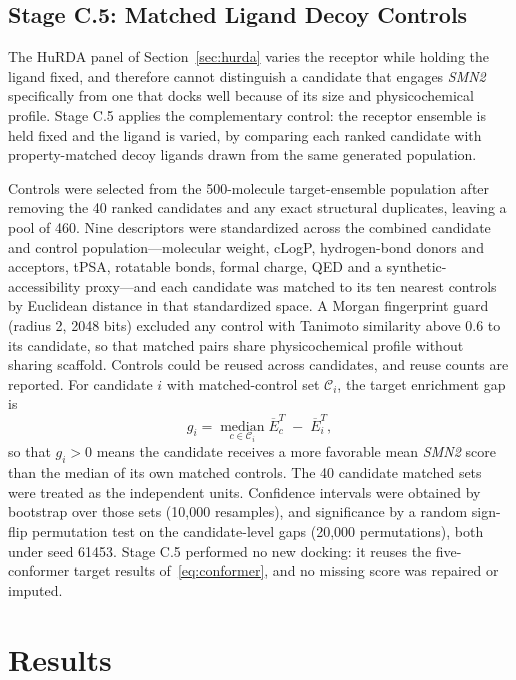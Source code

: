 \documentclass[journal]{IEEEtran}
\begin{document}
\subsection{Stage C.5: Matched Ligand Decoy Controls}
\label{sec:ligandcontrols}
The HuRDA panel of Section~\ref{sec:hurda} varies the receptor while
holding the ligand fixed, and therefore cannot distinguish a candidate
that engages \textit{SMN2} specifically from one that docks well
because of its size and physicochemical profile. Stage C.5 applies the
complementary control: the receptor ensemble is held fixed and the
ligand is varied, by comparing each ranked candidate with
property-matched decoy ligands drawn from the same generated
population.

Controls were selected from the 500-molecule target-ensemble population
after removing the 40 ranked candidates and any exact structural
duplicates, leaving a pool of 460. Nine descriptors were standardized
across the combined candidate and control population---molecular
weight, cLogP, hydrogen-bond donors and acceptors, tPSA, rotatable
bonds, formal charge, QED and a synthetic-accessibility proxy---and
each candidate was matched to its ten nearest controls by Euclidean
distance in that standardized space. A Morgan fingerprint guard
(radius 2, 2048 bits) excluded any control with Tanimoto similarity
above 0.6 to its candidate, so that matched pairs share physicochemical
profile without sharing scaffold. Controls could be reused across
candidates, and reuse counts are reported. For candidate $i$ with
matched-control set $\mathscr{C}_{i}$, the target enrichment gap is
\begin{equation}
g_{i} = \operatorname*{median}_{c \in \mathscr{C}_{i}}
        \overline{E}_{c}^{T} \;-\; \overline{E}_{i}^{T},
\label{eq:ligandgap}
\end{equation}
so that $g_{i} > 0$ means the candidate receives a more favorable mean
\textit{SMN2} score than the median of its own matched controls. The
40 candidate matched sets were treated as the independent units.
Confidence intervals were obtained by bootstrap over those sets
(10{,}000 resamples), and significance by a random sign-flip
permutation test on the candidate-level gaps (20{,}000 permutations),
both under seed 61453. Stage C.5 performed no new docking: it reuses
the five-conformer target results of~\eqref{eq:conformer}, and no
missing score was repaired or imputed.

\section{Results}
\end{document}
